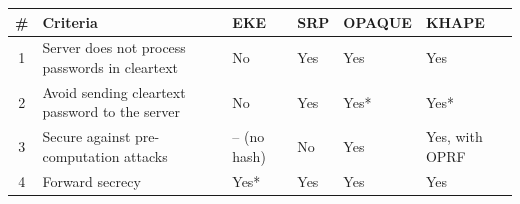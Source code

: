 ﻿\documentclass[../report.tex]{subfiles}
\begin{document}
\begin{center}
   \begin{tabular}{ | c | p{5cm} || p{2cm} | p{2cm} | p{2cm} | p{2cm} | }
     \hline
     \textbf{\#} & \textbf{Criteria} & \textbf{EKE} & \textbf{SRP} & \textbf{OPAQUE} & \textbf{KHAPE} \\ \hline
     
     
     
     1 & Server does not process passwords in cleartext & No & Yes & Yes & Yes \\ \hline
     2 & Avoid sending cleartext password to the server & No & Yes & Yes* & Yes* \\ \hline
     
     3 & Secure against pre-computation attacks & -- (no hash) & No & Yes & Yes, with OPRF \\ \hline
     4 & Forward secrecy & Yes* & Yes & Yes & Yes \\ \hline
     
     \end{tabular}
 \end{center}
 
\end{document}
